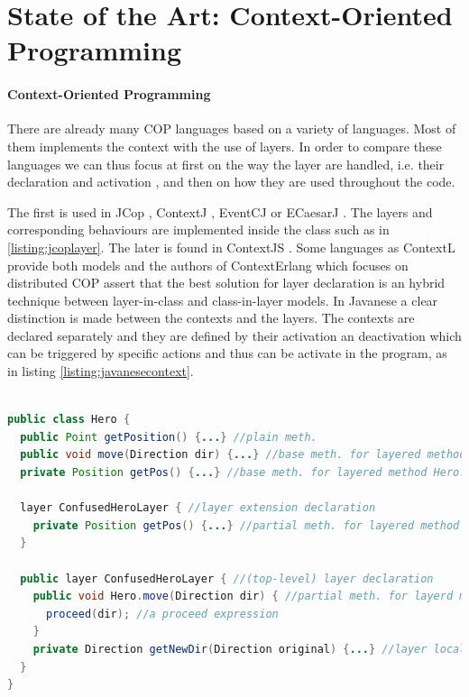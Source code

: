 \documentclass[a4paper]{article}
\begin{document}
\section{State of the Art: Context-Oriented Programming}
\label{section:stateoftheart}

\paragraph{Context-Oriented Programming}
There are already many COP languages based on a variety of languages. Most of them implements the context with the use of layers. In order to compare these languages we can thus focus at first on the way the layer are handled, i.e. their declaration and activation \cite{appeltauer_comparison_2009}, and then on how they are used throughout the code.

 The first is used in JCop \cite{appeltauer_declarative_2012}, ContextJ \cite{appeltauer_dedicated_2008} \cite{appeltauer_improving_2009}, EventCJ \cite{kamina_eventcj:_2011} or ECaesarJ \cite{nunez_declarative_2009}. The layers and corresponding behaviours are implemented inside the class such as in \ref{listing:jcoplayer}. The later is found in ContextJS \cite{lincke_open_2011}. Some languages as ContextL provide both models and the authors of ContextErlang \cite{ghezzi_context_2010} which focuses on distributed COP assert that the best solution for layer declaration is an hybrid technique between layer-in-class and class-in-layer models. In Javanese \cite{kamina_unified_2013} a clear distinction is made between the contexts and the layers. The contexts are declared separately and they are defined by their activation an deactivation which can be triggered by specific actions and thus can be activate in the program, as in listing \ref{listing:javanesecontext}.

\begin{lstlisting}[float, language=Java, caption=JCop layer example, label={listing:jcoplayer}]

public class Hero {
  public Point getPosition() {...} //plain meth.
  public void move(Direction dir) {...} //base meth. for layered method Hero.move
  private Position getPos() {...} //base meth. for layered method Hero.getPos
  
  layer ConfusedHeroLayer { //layer extension declaration
    private Position getPos() {...} //partial meth. for layered method Hero.getPos
  }

  public layer ConfusedHeroLayer { //(top-level) layer declaration
    public void Hero.move(Direction dir) { //partial meth. for layerd meth. Hero.move
      proceed(dir); //a proceed expression
    }
    private Direction getNewDir(Direction original) {...} //layer local method
  }
}
\end{lstlisting}
\end{document}
